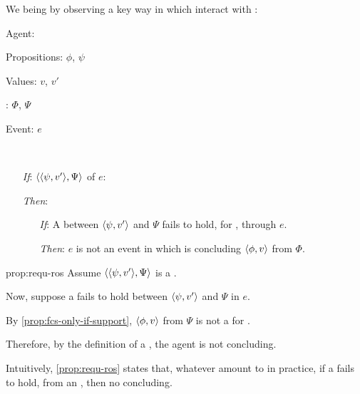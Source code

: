 \begin{note}
  We being by observing a key way in which  interact with :

  \begin{proposition}
    \label{prop:requ-ros}
    \begin{itemize*}[noitemsep, label=\(\circ\)]
    \item
      Agent: \vAgent{}
    \item
      Propositions: \(\phi\), \(\psi\)
    \item
      Values: \(v\), \(v'\)
    \item
      : \(\Phi\), \(\Psi\)
    \item
      Event: \(e\)
    \item
      \mbox{ }
    \end{itemize*}

    \begin{itemize}
    \item[\emph{If}:]
      \(\langle \langle \psi, v' \rangle, \Psi \rangle\) \requ{} of \(e\):
    \item[\emph{Then}:]
      \begin{itemize}
      \item[\emph{If}:]
        A \ros{} between \(\langle \psi, v' \rangle\) and \(\Psi\) fails to hold, for \vAgent{}, through \(e\).
      \item[\emph{Then}:]
        \(e\) is not an event in which \vAgent{} is concluding \(\langle \phi, v \rangle\) from \(\Phi\).
      \end{itemize}
    \end{itemize}
    \vspace{-\baselineskip}
  \end{proposition}

  \begin{argument}{prop:requ-ros}
    Assume \(\langle \langle \psi, v' \rangle, \Psi \rangle\) is a \requ{}.

    Now, suppose a \ros{} fails to hold between \(\langle \psi, v' \rangle\) and \(\Psi\) in \(e\).

    By \autoref{prop:fcs-only-if-support}, \(\langle \phi, v \rangle\) from \(\Psi\) is not a \fc{} for \vAgent{}.

    Therefore, by the definition of a \requ{}, the agent is not concluding.
  \end{argument}
\end{note}

\begin{note}
  Intuitively, \autoref{prop:requ-ros} states that, whatever  amount to in practice, if a \ros{} fails to hold, from an \agpe{}, then no concluding.

\end{note}

